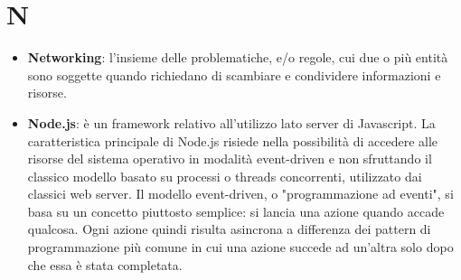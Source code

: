 \section{N}
\begin{itemize}
	\item
	\textbf{Networking}:  l’insieme delle problematiche, e/o regole, cui due o più entità sono soggette quando richiedano di scambiare e condividere informazioni e risorse.  
	\item
	\textbf{Node.js}:  è un framework relativo all'utilizzo lato server di Javascript.
	 La caratteristica principale di Node.js risiede nella possibilità di accedere alle risorse del sistema operativo in modalità event-driven e non sfruttando il classico modello basato su processi o threads concorrenti, utilizzato dai classici web server. Il modello event-driven, o "programmazione ad eventi", si basa su un concetto piuttosto semplice: si lancia una azione quando accade qualcosa. Ogni azione quindi risulta asincrona a differenza dei pattern di programmazione più comune in cui una azione succede ad un'altra solo dopo che essa è stata completata.
\end{itemize}